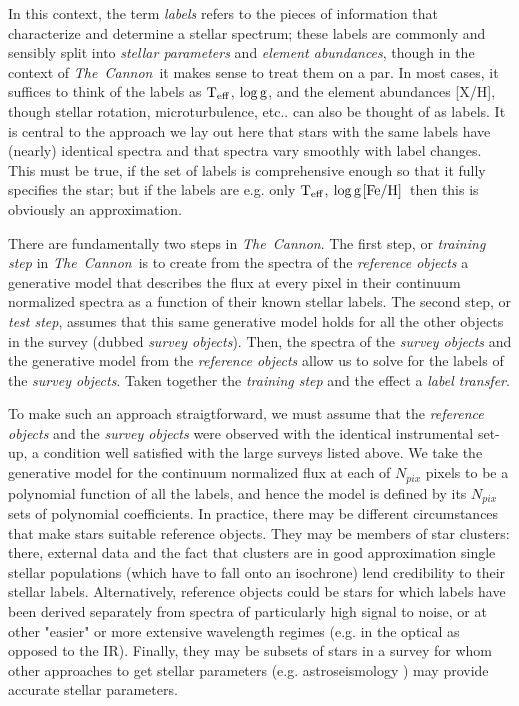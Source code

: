 \documentclass[12pt, preprint]{aastex}
\newcommand{\teff}{\mbox{$\rm T_{eff}$}}
\newcommand{\feh}{\mbox{$\rm [Fe/H]$}}
\newcommand{\logg}{\mbox{$\rm \log g$}}
\newcommand{\tc}{\textsl{The~Cannon}}
\begin{document}
In this context, the term {\sl labels} refers to the pieces of information that characterize and determine a stellar spectrum; these labels are commonly and sensibly split into {\sl stellar parameters} and {\sl element abundances}, though in the context of \tc\ it makes sense to treat them on a par. 
In most cases, it suffices to think of the labels as \teff , \logg, and the element abundances [X/H], though stellar rotation, microturbulence, etc.. can also be thought of as labels. It is central to the approach we lay out here that stars with the same labels have (nearly) identical spectra and that spectra vary smoothly with label changes. 
This must be true, if the set of labels is comprehensive enough so that it fully specifies the star; but if the labels are e.g. only \teff, \logg \feh\ then this is obviously an approximation. 

There are fundamentally two steps in \tc . 
The first step, or \textit{training step} in \tc\ is to create from the spectra of the \textit{reference objects} a generative model that describes
 the flux at every pixel in their continuum normalized spectra as a function of their known stellar labels.
The second step, or \textit{test step}, assumes that this same generative model holds for all the other objects in the survey (dubbed \textit{survey objects}). 
Then, the spectra of the \textit{survey objects} and the generative model from the \textit{reference objects}
allow us to solve for the labels of the \textit{survey objects}. 
Taken together the \textit{training step} and the  effect a \textit{label transfer}. 

To make such an approach straigtforward, we must assume that the \textit{reference objects} and the \textit{survey objects} were observed with the identical instrumental set-up, a condition well satisfied with the large surveys listed above. 
We take the generative model for the continuum normalized flux at each of $N_{pix}$ pixels to be a polynomial function of all the labels, and hence the model is defined by its $N_{pix}$ sets of polynomial coefficients. In practice, there may be different circumstances that make stars suitable reference objects. 
They may be members of star clusters: there, external data and the fact that clusters are in good approximation single stellar populations (which have to fall onto an isochrone) lend credibility to their stellar labels. 
Alternatively, reference objects could be stars for which labels have been derived separately from spectra of particularly high signal to noise, or at other "easier" or more extensive wavelength regimes (e.g. in the optical as opposed to the IR). 
Finally, they may be subsets of stars in a survey  for whom other approaches to get stellar parameters (e.g. astroseismology ) may provide accurate stellar parameters.
\end{document}
